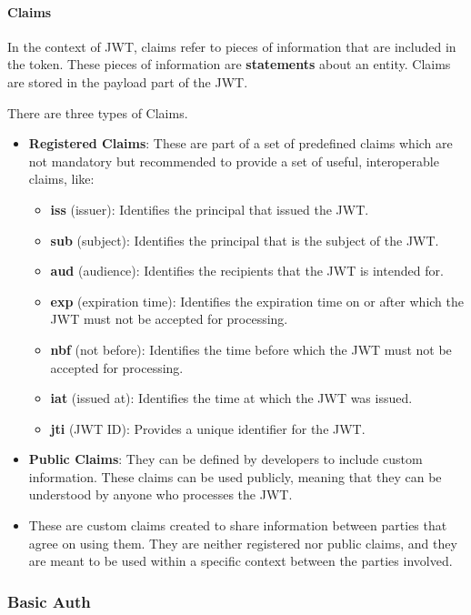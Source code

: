 \documentclass[a4paper]{article}
\begin{document}
    \paragraph*{Claims} In the context of JWT, claims refer to pieces of information that are included in the token. These pieces of information are \textbf{statements} about an entity. Claims are stored in the payload part of the JWT.

    There are three types of Claims.
    
    \begin{itemize}
        \item \textbf{Registered Claims}: These are part of a set of predefined claims which are not mandatory but recommended to provide a set of useful, interoperable claims, like:
        \begin{itemize}
            \item \textbf{iss} (issuer): Identifies the principal that issued the JWT.
            \item \textbf{sub} (subject): Identifies the principal that is the subject of the JWT.
            \item \textbf{aud} (audience): Identifies the recipients that the JWT is intended for.
            \item \textbf{exp} (expiration time): Identifies the expiration time on or after which the JWT must not be accepted for processing.
            \item \textbf{nbf} (not before): Identifies the time before which the JWT must not be accepted for processing.
            \item \textbf{iat} (issued at): Identifies the time at which the JWT was issued.
            \item \textbf{jti} (JWT ID): Provides a unique identifier for the JWT.
        \end{itemize}
        \item \textbf{Public Claims}: They can be defined by developers to include custom information. These claims can be used publicly, meaning that they can be understood by anyone who processes the JWT.
        \item These are custom claims created to share information between parties that agree on using them. They are neither registered nor public claims, and they are meant to be used within a specific context between the parties involved.
    \end{itemize}


    \subsubsection{Basic Auth}
\end{document}
